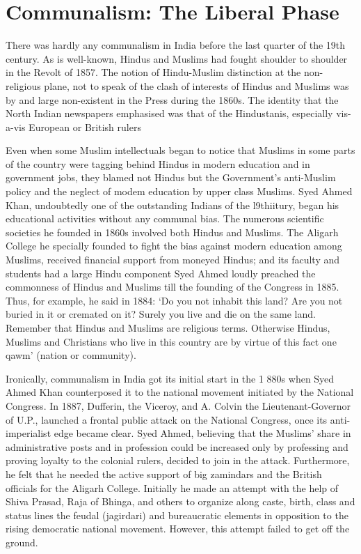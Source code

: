 \chapter{Communalism: The Liberal Phase}
\begin{multicols}{2}

There was hardly any communalism in India before the last quarter of the 19th century. As is well-known, Hindus and Muslims had fought shoulder to shoulder in the Revolt of 1857. The notion of Hindu-Muslim distinction at the non-religious plane, not to speak of the clash of interests of Hindus and Muslims was by and large non-existent in the Press during the 1860s. The identity that the North Indian newspapers emphasised was that of the Hindustanis, especially vis-a-vis European or British rulers 

Even when some Muslim intellectuals began to notice that Muslims in some parts of the country were tagging behind Hindus in modern education and in government jobs, they blamed not Hindus but the Government's anti-Muslim policy and the neglect of modem education by upper class Muslims. Syed Ahmed Khan, undoubtedly one of the outstanding Indians of the l9thiitury, began his educational activities without any communal bias. The numerous scientific societies he founded in 1860s involved both Hindus and Muslims. The Aligarh College he specially founded to fight the bias against modern education among Muslims, received financial support from moneyed Hindus; and its faculty and students had a large Hindu component Syed Ahmed loudly preached the commonness of Hindus and Muslims till the founding of the Congress in 1885. Thus, for example, he said in 1884: `Do you not inhabit this land? Are you not buried in it or cremated on it? Surely you live and die on the same land. Remember that Hindus and Muslims are religious terms. Otherwise Hindus, Muslims and Christians who live in this country are by virtue of this fact one qawm' (nation or community). 

Ironically, communalism in India got its initial start in the 1 880s when Syed Ahmed Khan counterposed it to the national movement initiated by the National Congress. In 1887, Dufferin, the Viceroy, and A. Colvin the Lieutenant-Governor of U.P., launched a frontal public attack on the National Congress, once its anti-imperialist edge became clear. Syed Ahmed, believing that the Muslims' share in administrative posts and in profession could be increased only by professing and proving loyalty to the colonial rulers, decided to join in the attack. Furthermore, he felt that he needed the active support of big zamindars and the British officials for the Aligarh College. Initially he made an attempt with the help of Shiva Prasad, Raja of Bhinga, and others to organize along caste, birth, class and status lines the feudal (jagirdari) and bureaucratic elements in opposition to the rising democratic national movement. However, this attempt failed to get off the ground. 


\end{multicols}
